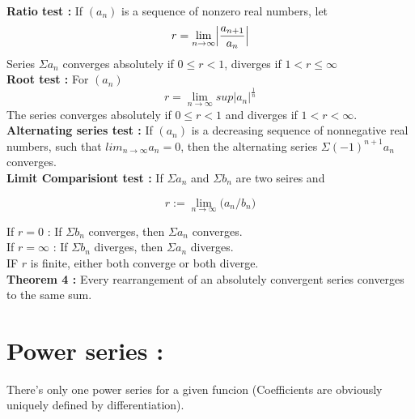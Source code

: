 \documentclass{report}
\begin{document}
\noindent \textbf{Ratio test :} If $(a_n)$ is a sequence of nonzero real numbers, let 
$$ r = \lim_{n\to\infty}\Bigl|\frac{a_{n+1}}{a_n}\Bigr|$$
\noindent Series $\Sigma a_n$ converges absolutely if $0\le r<1$, diverges if $1<r\le \infty$\\

\noindent \textbf{Root test :} For $(a_n)$
$$ r = \lim_{n\to\infty} sup|a_n|^{\frac{1}{n}}$$
\noindent The series converges absolutely if $0\le r<1$ and diverges if $1<r<\infty$.\\

\noindent\textbf{Alternating series test :} If $(a_n)$ is a decreasing sequence of nonnegative real numbers, such that $lim_{n\to\infty}a_n=0$, then the alternating series $\Sigma (-1)^{n+1}a_n$ converges.\\

\noindent\textbf{Limit Comparisiont test :} If $\Sigma a_n$ and $\Sigma b_n$ are two seires and 

$$ r:= \lim_{n\to\infty}\big(a_n/b_n\big) $$

\noindent If $r=0$ : If $\Sigma b_n$ converges, then $\Sigma a_n$ converges.\\
\noindent If $r=\infty$ : If $\Sigma b_n$ diverges, then $\Sigma a_n$ diverges.\\
\noindent IF $r$ is finite, either both converge or both diverge.\\

\noindent\textbf{Theorem 4 :} Every rearrangement of an absolutely convergent series converges to the same sum.\\

\section{Power series :}

There's only one power series for a given funcion (Coefficients are obviously uniquely defined by differentiation).
\end{document}
